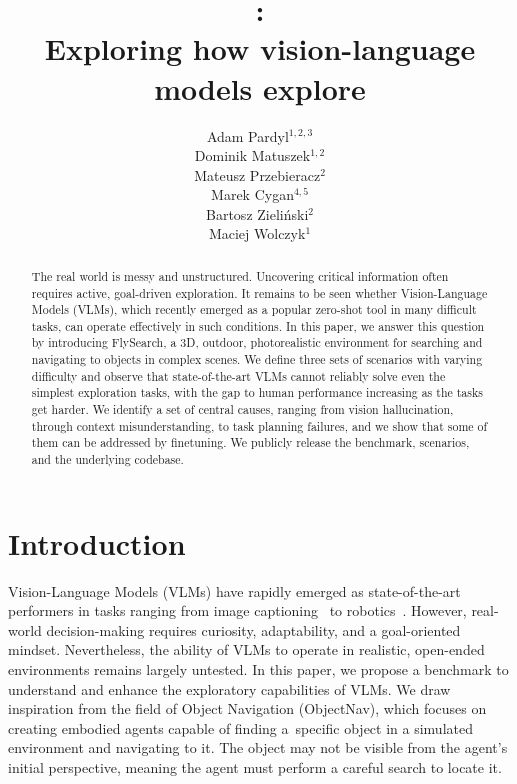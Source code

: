 \documentclass{article}
\title{\ours{}:\\Exploring how vision-language models explore}
\author{%
  Adam Pardyl$^{1,2,3}$ \\
  \And
  Dominik Matuszek$^{1,2}$ \\
  \And
  Mateusz Przebieracz$^{2}$ \\
  \And
  Marek Cygan$^{4,5}$ \\
  \And
  Bartosz Zieliński$^{2}$ \\
  \And
  Maciej Wolczyk$^{1}$ \\
}
\theoremstyle{plain}
\theoremstyle{definition}
\theoremstyle{remark}
\newcommand{\ours}{FlySearch}
\begin{document}
\maketitle


\begin{abstract}
The real world is messy and unstructured. Uncovering critical information often requires active, goal-driven exploration. It remains to be seen whether Vision-Language Models (VLMs), which recently emerged as a popular zero-shot tool in many difficult tasks, can operate effectively in such conditions.
In this paper, we answer this question by introducing \ours{}, a 3D, outdoor, photorealistic environment for searching and navigating to objects in complex scenes. We define three sets of scenarios with varying difficulty and observe that state-of-the-art VLMs cannot reliably solve even the simplest exploration tasks, with the gap to human performance increasing as the tasks get harder. We identify a set of central causes, ranging from vision hallucination, through context misunderstanding, to task planning failures, and we show that some of them can be addressed by finetuning. We publicly release the benchmark, scenarios, and the underlying codebase.

\end{abstract}


\section{Introduction}
\label{sec:intro}

Vision-Language Models (VLMs) have rapidly emerged as state-of-the-art performers in tasks ranging from image captioning~\cite{li2022blip,zhang2021vinvl} to robotics~\cite{black2024pi_0,google2024pivot}. However, real-world decision-making requires curiosity, adaptability, and a goal-oriented mindset. Nevertheless, the ability of VLMs to operate in realistic, open-ended environments remains largely untested. In this paper, we propose a benchmark to understand and enhance the exploratory capabilities of VLMs. We draw inspiration from the field of Object Navigation (ObjectNav), which focuses on creating embodied agents capable of finding a~specific object in a simulated environment and navigating to it. The object may not be visible from the agent's initial perspective, meaning the agent must perform a careful search to locate it.
\end{document}
